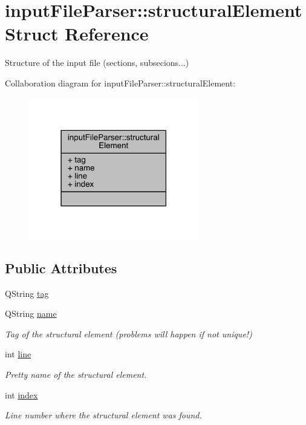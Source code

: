 \hypertarget{structinput_file_parser_1_1structural_element}{\section{input\+File\+Parser\+:\+:structural\+Element Struct Reference}
\label{structinput_file_parser_1_1structural_element}
}


Structure of the input file (sections, subsecions...)  




Collaboration diagram for input\+File\+Parser\+:\+:structural\+Element\+:\nopagebreak
\begin{figure}[H]
\begin{center}
\leavevmode
\includegraphics[width=210pt]{structinput_file_parser_1_1structural_element__coll__graph}
\end{center}
\end{figure}
\subsection*{Public Attributes}
\begin{DoxyCompactItemize}
\item 
Q\+String \hyperlink{structinput_file_parser_1_1structural_element_a7e471738baf1165d492ab43205c9aedc}{tag}
\item 
Q\+String \hyperlink{structinput_file_parser_1_1structural_element_a581746e08e40647fa26ee7c783e1f651}{name}
\begin{DoxyCompactList}\small\item\em Tag of the structural element (problems will happen if not unique!) \end{DoxyCompactList}\item 
int \hyperlink{structinput_file_parser_1_1structural_element_a6e9e6f37052a07118e9fd21bc1563714}{line}
\begin{DoxyCompactList}\small\item\em Pretty name of the structural element. \end{DoxyCompactList}\item 
int \hyperlink{structinput_file_parser_1_1structural_element_ab6668b6a416e6f849c8cf4e106531d87}{index}
\begin{DoxyCompactList}\small\item\em Line number where the structural element was found. \end{DoxyCompactList}\end{DoxyCompactItemize}


